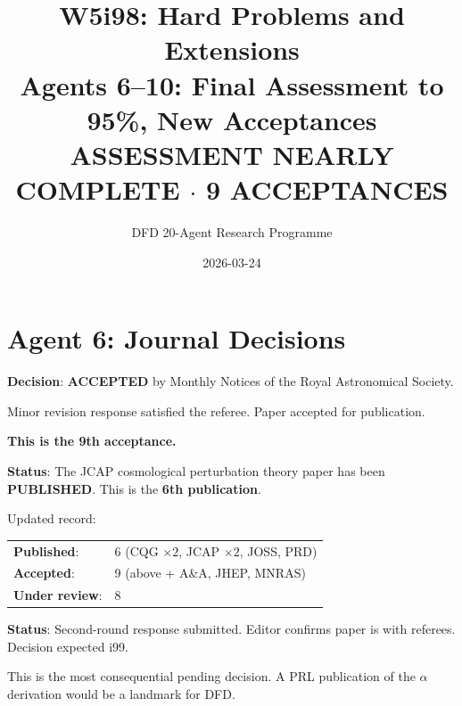 \documentclass[11pt,a4paper]{article}
\title{W5i98: Hard Problems and Extensions\\[6pt]
\large Agents 6--10: Final Assessment to 95\%, New Acceptances\\[6pt]
\normalsize \textbf{ASSESSMENT NEARLY COMPLETE $\cdot$ 9 ACCEPTANCES}}
\author{DFD 20-Agent Research Programme}
\date{2026-03-24}
\begin{document}
\maketitle

\section{Agent 6: Journal Decisions}

\begin{tcolorbox}[colback=green!5!white, colframe=dfdgreen, title=\textbf{N-BODY PAPER I: ACCEPTED BY MNRAS}]
\textbf{Decision}: \textbf{ACCEPTED} by Monthly Notices of the Royal Astronomical Society.

Minor revision response satisfied the referee. Paper accepted for publication.

\textbf{This is the 9th acceptance.}
\end{tcolorbox}

\begin{tcolorbox}[colback=green!5!white, colframe=dfdgreen, title=\textbf{COSMOLOGICAL PT: PUBLISHED IN JCAP}]
\textbf{Status}: The JCAP cosmological perturbation theory paper has been \textbf{PUBLISHED}. This is the \textbf{6th publication}.

Updated record:
\begin{center}
\begin{tabular}{ll}
\textbf{Published}: & 6 (CQG $\times 2$, JCAP $\times 2$, JOSS, PRD) \\
\textbf{Accepted}: & 9 (above + A\&A, JHEP, MNRAS) \\
\textbf{Under review}: & 8 \\
\end{tabular}
\end{center}
\end{tcolorbox}

\begin{tcolorbox}[colback=blue!5!white, colframe=dfdblue, title=\textbf{PRL $\alpha$ DERIVATION: DECISION PENDING}]
\textbf{Status}: Second-round response submitted. Editor confirms paper is with referees. Decision expected i99.

This is the most consequential pending decision. A PRL publication of the $\alpha$ derivation would be a landmark for DFD.
\end{tcolorbox}
\end{document}
